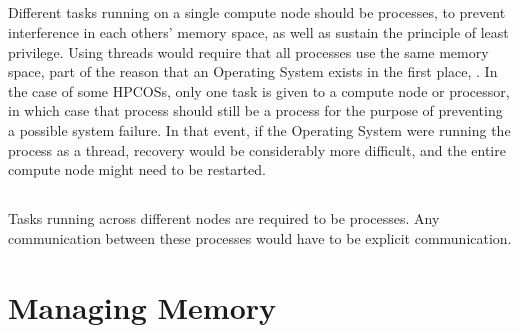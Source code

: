 \documentclass{article}
\begin{document}
\subsection{}
Different tasks running on a single compute node should be processes, to prevent interference in each others' memory space, as well as sustain the principle of least privilege. Using threads would require that all processes use the same memory space, part of the reason that an Operating System exists in the first place, .
In the case of some HPCOSs, only one task is given to a compute node or processor, in which case that process should still be a process for the purpose of preventing a possible system failure. In that event, if the Operating System were running the process as a thread, recovery would be considerably more difficult, and the entire compute node might need to be restarted.

\subsection{}
Tasks running across different nodes are required to be processes. Any communication between these processes would have to be explicit communication.

\setcounter{section}{4}
\setcounter{subsection}{0}
\section*{Managing Memory}
\subsection{}

\subsection{}

\subsection{}

\subsection{}

\subsection{}

\subsection{}
\end{document}
